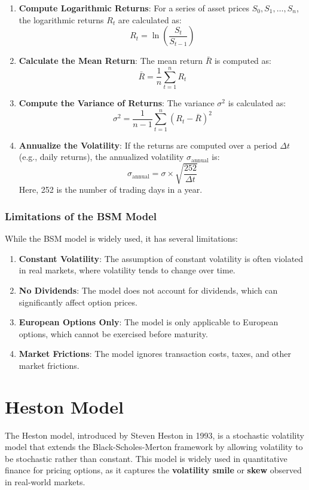 \documentclass[11pt, oneside, a4paper, titlepage]{report}
\begin{document}
\begin{enumerate}
    \item \textbf{Compute Logarithmic Returns}:
    For a series of asset prices $S_0, S_1, \dots, S_n$, the logarithmic returns $R_t$ are calculated as:
    \[
    R_t = \ln\left(\frac{S_t}{S_{t-1}}\right)
    \]
    \item \textbf{Calculate the Mean Return}:
    The mean return $\bar{R}$ is computed as:
    \[
    \bar{R} = \frac{1}{n} \sum_{t=1}^n R_t
    \]
    \item \textbf{Compute the Variance of Returns}:
    The variance $\sigma^2$ is calculated as:
    \[
    \sigma^2 = \frac{1}{n-1} \sum_{t=1}^n (R_t - \bar{R})^2
    \]
    \item \textbf{Annualize the Volatility}:
    If the returns are computed over a period $\Delta t$ (e.g., daily returns), the annualized volatility $\sigma_{\text{annual}}$ is:
    \[
    \sigma_{\text{annual}} = \sigma \times \sqrt{\frac{252}{\Delta t}}
    \]
    Here, 252 is the number of trading days in a year.
\end{enumerate}

\subsubsection{Limitations of the BSM Model}

While the BSM model is widely used, it has several limitations:
\begin{enumerate}
    \item \textbf{Constant Volatility}: The assumption of constant volatility is often violated in real markets, where volatility tends to change over time.
    \item \textbf{No Dividends}: The model does not account for dividends, which can significantly affect option prices.
    \item \textbf{European Options Only}: The model is only applicable to European options, which cannot be exercised before maturity.
    \item \textbf{Market Frictions}: The model ignores transaction costs, taxes, and other market frictions.
\end{enumerate}

\section{Heston Model}

The Heston model, introduced by Steven Heston in 1993, is a stochastic volatility model that extends the Black-Scholes-Merton framework by allowing volatility to be stochastic rather than constant. This model is widely used in quantitative finance for pricing options, as it captures the \textbf{volatility smile} or \textbf{skew} observed in real-world markets.
\end{document}
